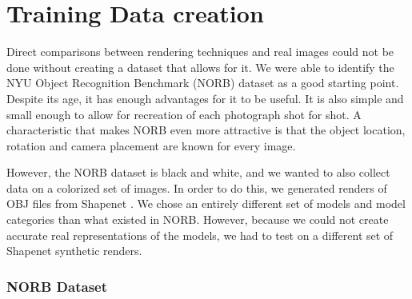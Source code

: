 \documentclass[10pt,twocolumn,letterpaper]{article}
\begin{document}
\section{Training Data creation}
Direct comparisons between rendering techniques and real images could not be done without creating a dataset that allows for it.  We were able to identify the NYU Object Recognition Benchmark (NORB) dataset \cite{LeCun:2004:LMG:1896300.1896315} as a good starting point. Despite its age, it has enough advantages for it to be useful.  It is also simple and small enough to allow for recreation of each photograph shot for shot.  A characteristic that makes NORB even more attractive is that the object location, rotation and camera placement are known for every image.

However, the NORB dataset is black and white, and we wanted to also collect data on a colorized set of images. In order to do this, we generated renders of OBJ files from Shapenet \cite{DBLP:journals/corr/ChangFGHHLSSSSX15}. We chose an entirely different set of models and model categories than what existed in NORB. However, because we could not create accurate real representations of the models, we had to test on a different set of Shapenet synthetic renders.
\subsubsection{NORB Dataset}

\end{document}
